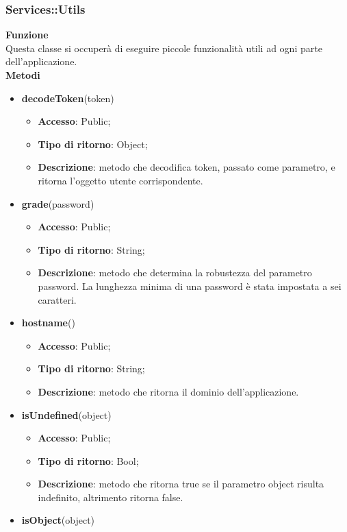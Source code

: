 {{		\subsubsection{Services::\-Utils}{
			\label{sub:servicesUtils}
			\textbf{Funzione}\\
			\indent Questa classe si occuperà di eseguire piccole funzionalità utili ad ogni parte dell'applicazione.\\
			\textbf{Metodi}
			\begin{itemize}
				\item \textbf{decodeToken}(token)
				\begin{itemize}
					\item \textbf{Accesso}: Public;
					\item \textbf{Tipo di ritorno}: Object;
					\item \textbf{Descrizione}: metodo che decodifica token, passato come parametro, e ritorna l'oggetto utente corrispondente.
				\end{itemize}
				\item \textbf{grade}(password)
				\begin{itemize}
					\item \textbf{Accesso}: Public;
					\item \textbf{Tipo di ritorno}: String;
					\item \textbf{Descrizione}: metodo che determina la robustezza del parametro password. La lunghezza minima di una password è stata impostata a sei caratteri.
				\end{itemize}
				\item \textbf{hostname}()
				\begin{itemize}
					\item \textbf{Accesso}: Public;
					\item \textbf{Tipo di ritorno}: String;
					\item \textbf{Descrizione}: metodo che ritorna il dominio dell'applicazione.
				\end{itemize}
				\item \textbf{isUndefined}(object)
				\begin{itemize}
					\item \textbf{Accesso}: Public;
					\item \textbf{Tipo di ritorno}: Bool;
					\item \textbf{Descrizione}: metodo che ritorna true se il parametro object risulta indefinito, altrimento ritorna false.
				\end{itemize}
				\item \textbf{isObject}(object)

\end{itemize}}}}
